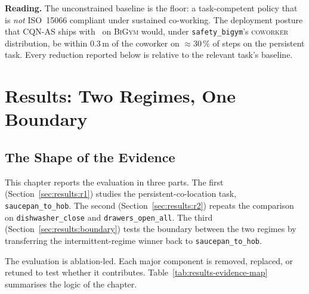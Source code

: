 \documentclass[11pt,a4paper]{report}
\newcommand{\iso}{ISO~15066}
\newcommand{\bigym}{\textsc{BiGym}}
\newcommand{\sbigym}{\texttt{safety\_bigym}}
\newcommand{\cqnas}{CQN-AS}
\newcommand{\coworker}{\textsc{coworker}}
\begin{document}
\textbf{Reading.} The unconstrained baseline is the floor: a
task-competent policy that is \emph{not} \iso{} compliant under
sustained co-working. The deployment posture that \cqnas{}
ships with~\cite{seo2024cqnas} on \bigym{} would, under \sbigym{}'s
\coworker{} distribution, be within $0.3$\,m of the coworker on
$\approx$30\,\% of steps on the persistent task. Every reduction
reported below is relative to the relevant task's baseline.



\chapter{Results: Two Regimes, One Boundary}
\label{ch:eval}

\section{The Shape of the Evidence}
\label{sec:results:ablation-map}

This chapter reports the evaluation in three parts. The first
(Section~\ref{sec:results:r1}) studies the persistent-co-location
task, \texttt{saucepan\_to\_hob}. The second
(Section~\ref{sec:results:r2}) repeats the comparison on
\texttt{dishwasher\_close} and \texttt{drawers\_open\_all}. The third
(Section~\ref{sec:results:boundary}) tests the boundary between the
two regimes by transferring the intermittent-regime winner back to
\texttt{saucepan\_to\_hob}.

The evaluation is ablation-led. Each major component is removed,
replaced, or retuned to test whether it contributes. Table~\ref{tab:results-evidence-map}
summarises the logic of the chapter.
\end{document}
